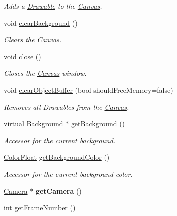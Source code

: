 \begin{DoxyCompactItemize}
\begin{DoxyCompactList}\small\item\em Adds a \hyperlink{classtsgl_1_1_drawable}{Drawable} to the \hyperlink{classtsgl_1_1_canvas}{Canvas}. \end{DoxyCompactList}\item 
void \hyperlink{classtsgl_1_1_canvas_af1f7728d3f65494fe463bf6e8fcb28cc}{clear\+Background} ()
\begin{DoxyCompactList}\small\item\em Clears the \hyperlink{classtsgl_1_1_canvas}{Canvas}. \end{DoxyCompactList}\item 
void \hyperlink{classtsgl_1_1_canvas_afaa1250b1da6b48b9c170a0655191938}{close} ()
\begin{DoxyCompactList}\small\item\em Closes the \hyperlink{classtsgl_1_1_canvas}{Canvas} window. \end{DoxyCompactList}\item 
void \hyperlink{classtsgl_1_1_canvas_aae3223aa585a9992924e7aba16eb1fd8}{clear\+Object\+Buffer} (bool should\+Free\+Memory=false)
\begin{DoxyCompactList}\small\item\em Removes all Drawables from the \hyperlink{classtsgl_1_1_canvas}{Canvas}. \end{DoxyCompactList}\item 
virtual \hyperlink{classtsgl_1_1_background}{Background} $\ast$ \hyperlink{classtsgl_1_1_canvas_a905c38881402fe1d53cab427b93aab2f}{get\+Background} ()
\begin{DoxyCompactList}\small\item\em Accessor for the current background. \end{DoxyCompactList}\item 
\hyperlink{structtsgl_1_1_color_float}{Color\+Float} \hyperlink{classtsgl_1_1_canvas_a2b39e50888d61e88527a66ac0f6ac880}{get\+Background\+Color} ()
\begin{DoxyCompactList}\small\item\em Accessor for the current background color. \end{DoxyCompactList}\item 
\mbox{\label{classtsgl_1_1_canvas_a7118df5293e875a919467d93c01e98d7}} 
\hyperlink{classtsgl_1_1_camera}{Camera} $\ast$ {\bfseries get\+Camera} ()
\item 
int \hyperlink{classtsgl_1_1_canvas_af4f8f2b1abd27316a4a39ae097407d37}{get\+Frame\+Number} ()

\end{DoxyCompactItemize}
